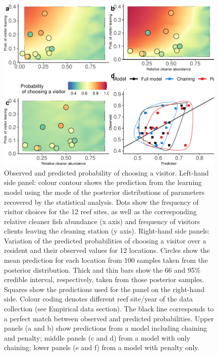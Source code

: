 \documentclass[
  12pt,
]{article}
\begin{document}
\begin{figure}
\includegraphics[width=1\linewidth]{manuscript_BE_files/figure-latex/predPAA-1} \caption{Observed and predicted probability of choosing a visitor. Left-hand side panel: colour contour shows the prediction from the learning model using the mode of the posterior distributions of parameters recovered by the statistical analysis. Dots show the frequency of visitor choices for the 12 reef sites, as well as the corresponding relative cleaner fish abundance (x axis) and frequency of visitors clients leaving the cleaning station (y axis). Right-hand side panels: Variation of the predicted probabilities  of choosing a visitor over a resident and their observed values for 12 locations. Circles show the mean prediction for each location from 100 samples taken from the posterior distribution. Thick and thin bars show the 66 and 95\% credible interval, respectively, taken from those posterior samples. Squares show the predictions used for the panel on the right-hand side. Colour coding denotes different reef site/year of the data collection (see Empirical data section). The black line corresponds to a perfect match between observed and predicted probabilities. Upper panels (a and b) show predictions from a model including chaining and penalty; middle panels (c and d) from a  model with only chaining; lower panels (e and f) from a model with penalty only.}\label{fig:predPAA}
\end{figure}
\end{document}
